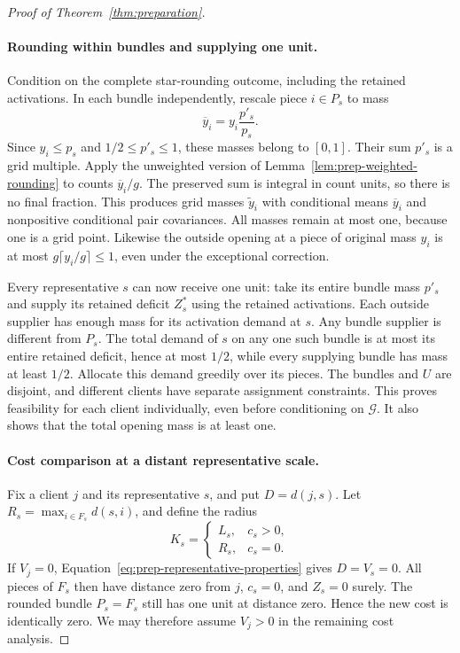 \begin{proof}[Proof of Theorem~\ref{thm:preparation}]
\paragraph{Rounding within bundles and supplying one unit.}
Condition on the complete star-rounding outcome, including the retained
activations.  In each bundle independently, rescale piece $i\in P_s$ to
mass
\[
 \overline y_i=y_i\frac{p'_s}{p_s}.
\]
Since $y_i\le p_s$ and $1/2\le p'_s\le1$, these masses belong to $[0,1]$.
Their sum $p'_s$ is a grid multiple.  Apply the unweighted version of
Lemma~\ref{lem:prep-weighted-rounding} to counts $\overline y_i/g$.
The preserved sum is integral in count units, so there is no final
fraction.  This produces grid masses $\widetilde y_i$ with conditional
means $\overline y_i$ and nonpositive conditional pair covariances.
All masses remain at most one, because one is a grid point.  Likewise
the outside opening at a piece of original mass $y_i$ is at most
$g\lceil y_i/g\rceil\le1$, even under the exceptional correction.

Every representative $s$ can now receive one unit: take its entire
bundle mass $p'_s$ and supply its retained deficit $Z_s^*$ using the
retained activations.  Each outside supplier has enough mass for its
activation demand at $s$.  Any bundle supplier is different from $P_s$.
The total demand of $s$ on any one such bundle is at most its entire
retained deficit, hence at most $1/2$, while every supplying bundle has
mass at least $1/2$.  Allocate this demand greedily over its pieces.
The bundles and $U$ are disjoint, and different clients have separate
assignment constraints.  This proves feasibility for each client
individually, even before conditioning on $\mathcal G$.  It also shows
that the total opening mass is at least one.

\paragraph{Cost comparison at a distant representative scale.}
Fix a client $j$ and its representative $s$, and put $D=d(j,s)$.
Let $R_s=\max_{i\in F_s}d(s,i)$, and define the radius
\[
 K_s=\begin{cases}L_s,&c_s>0,\\R_s,&c_s=0.\end{cases}
\]
If $V_j=0$, Equation~\ref{eq:prep-representative-properties} gives
$D=V_s=0$.  All pieces of $F_s$ then have distance zero from $j$,
$c_s=0$, and $Z_s=0$ surely.  The rounded bundle $P_s=F_s$ still has
one unit at distance zero.  Hence the new cost is identically zero.
We may therefore assume $V_j>0$ in the remaining cost analysis.


\end{proof}
